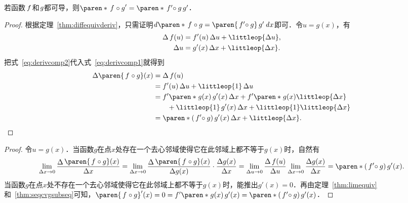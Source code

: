 \begin{theorem}[复合函数的导数]
  \label{thm:derivcomp}
  若函数\(\,f\mkern2mu\)和\(\mkern1mu g\)都可导，则\(\paren*{\,f\mkern1mu \circ g}' = \paren*{\,f'\mkern-4mu \circ g}\,g'\)．

  \begin{proof}
    根据定理~\ref{thm:diffequivderiv}，只需证明\(\diff\paren*{\,f\mkern1mu \circ g} =  \paren{\,f'\mkern-4mu \circ g}\,g' \dx\)即可．令\(u = g(x)\)，有
    \begin{align}
      \fwdf\,f(u)
      &= f'(u) \fdu + \littleop{\fdu},
        \label{eq:derivcomp1} \\
      \fdu
      &= g'(x) \fdx + \littleop{\fdx}.
        \label{eq:derivcomp2}
    \end{align}
    把式~\eqref{eq:derivcomp2}代入式~\eqref{eq:derivcomp1}就得到
    \begin{equation*}
      \begin{split}
        \fwdf\paren{\,f\mkern1mu \circ g}(x)
        &= \fwdf\,f(u) \\
        &= f'(u) \fdu + \littleop{1} \fdu \\
        &= f'\paren*{\mkern1mu g(x)}\,g'(x) \fdx + f'\paren*{\mkern1mu g(x)} \littleop{\fdx} \\
        &\qquad + \littleop{1}\,g'(x) \fdx + \littleop{1} \littleop{\fdx} \\
        &= \paren*{(\,f'\mkern-4mu \circ g)\,g'}(x) \fdx + \littleop{\fdx}.
        \qedhere
      \end{split}
    \end{equation*}
  \end{proof}
  \begin{proof}
    令\(u = g(x)\)．当函数\(g\)在点\(x\)处存在一个去心邻域使得它在此邻域上都不等于\(g(x)\)时，自然有
    \begin{equation*}
      \lim_{\fdx\to0} \frac{\Fn\Delta\paren{\,f\mkern1mu \circ g}(x)}{\fdx}
      = \lim_{\fdx\to0} \frac{\Fn\Delta\paren{\,f\mkern1mu \circ g}(x)}{\fwdf g(x)}
      \cdot \frac{\fwdf g(x)}{\fdx}
      = \lim_{\fdu\to0}\frac{\fwdf\,f(u)}{\fdu} \lim_{\fdx\to0} \frac{\fwdf g(x)}{\fdx}
      = \paren*{(\,f'\mkern-4mu \circ g)\,g'}(x).
    \end{equation*}
    当函数\(g\)在点\(x\)处不存在一个去心邻域使得它在此邻域上都不等于\(g(x)\)时，能推出\(g'(x) = 0\)．再由定理~\ref{thm:limequiv}和~\ref{thm:seqcvgsubseq}可知，\(\paren{\,f\mkern1mu \circ g}'(x) = 0 = f'\paren*{\mkern1mu g(x)}\,g'(x) = \paren*{(\,f'\mkern-4mu \circ g)\,g'}(x)\)．
  \end{proof}
\end{theorem}

